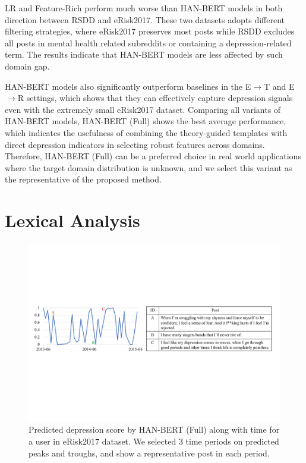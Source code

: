 \documentclass{article}
\begin{document}
LR and Feature-Rich perform much worse than HAN-BERT models in both direction between RSDD and eRisk2017. These two datasets adopts different filtering strategies, where eRisk2017 preserves most posts while RSDD excludes all posts in mental health related subreddits or containing a depression-related term. The results indicate that HAN-BERT models are less affected by such domain gap. 

HAN-BERT models also significantly outperform baselines in the E$\rightarrow$T and E$\rightarrow$R settings, which shows that they can effectively capture depression signals even with the extremely small eRisk2017 dataset. Comparing all variants of HAN-BERT models, HAN-BERT (Full) shows the best average performance, which indicates the usefulness of combining the theory-guided templates with direct depression indicators in selecting robust features across domains. Therefore, HAN-BERT (Full) can be a preferred choice in real world applications where the target domain distribution is unknown, and we select this variant as the representative of the proposed method.

\section{Lexical Analysis}

\begin{figure}[t]
    \centering
    \includegraphics[width=2\columnwidth]{figures/curve.pdf}
    \caption{Predicted depression score by HAN-BERT (Full) along with time for a user in eRisk2017 dataset. We selected 3 time periods on predicted peaks and troughs, and show a representative post in each period.}
    \label{fig:curve}
\end{figure}
\end{document}
